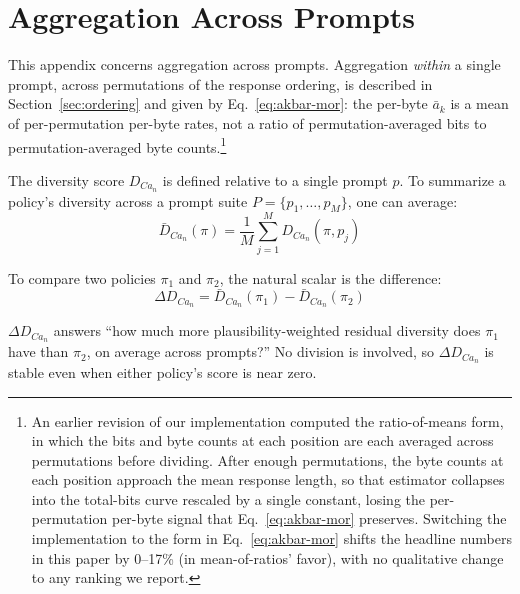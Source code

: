 \section{Aggregation Across Prompts}\label{app:aggregation}

This appendix concerns aggregation across prompts.
Aggregation \emph{within} a single prompt, across permutations of the response ordering, is described in Section~\ref{sec:ordering} and given by Eq.~\eqref{eq:akbar-mor}: the per-byte $\bar{a}_k$ is a mean of per-permutation per-byte rates, not a ratio of permutation-averaged bits to permutation-averaged byte counts.\footnote{An earlier revision of our implementation computed the ratio-of-means form, in which the bits and byte counts at each position are each averaged across permutations before dividing.
After enough permutations, the byte counts at each position approach the mean response length, so that estimator collapses into the total-bits curve rescaled by a single constant, losing the per-permutation per-byte signal that Eq.~\eqref{eq:akbar-mor} preserves.
Switching the implementation to the form in Eq.~\eqref{eq:akbar-mor} shifts the headline numbers in this paper by 0--17\% (in mean-of-ratios' favor), with no qualitative change to any ranking we report.}

The diversity score $D_{Ca_n}$ is defined relative to a single prompt $p$.
To summarize a policy's diversity across a prompt suite $P = \{p_1, \ldots, p_M\}$, one can average:
\begin{equation}
    \bar{D}_{Ca_n}(\pi) = \frac{1}{M}\sum_{j=1}^{M} D_{Ca_n}(\pi, p_j)
\end{equation}

To compare two policies $\pi_1$ and $\pi_2$, the natural scalar is the difference:
\begin{equation}
    \Delta D_{Ca_n} = \bar{D}_{Ca_n}(\pi_1) - \bar{D}_{Ca_n}(\pi_2)
\end{equation}

$\Delta D_{Ca_n}$ answers ``how much more plausibility-weighted residual diversity does $\pi_1$ have than $\pi_2$, on average across prompts?''
No division is involved, so $\Delta D_{Ca_n}$ is stable even when either policy's score is near zero.